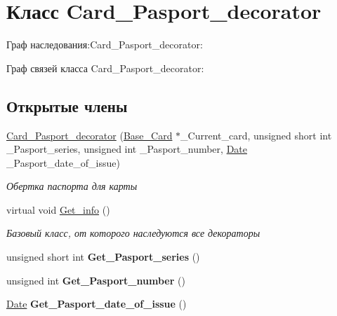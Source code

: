 \hypertarget{classCard__Pasport__decorator}{}\section{Класс Card\+\_\+\+Pasport\+\_\+decorator}
\label{classCard__Pasport__decorator}


Граф наследования\+:Card\+\_\+\+Pasport\+\_\+decorator\+:


Граф связей класса Card\+\_\+\+Pasport\+\_\+decorator\+:
\subsection*{Открытые члены}
\begin{DoxyCompactItemize}
\item 
\hyperlink{classCard__Pasport__decorator_a66287c3d536efc70968bb8cfbf84ebb1}{Card\+\_\+\+Pasport\+\_\+decorator} (\hyperlink{classBase__Card}{Base\+\_\+\+Card} $\ast$\+\_\+\+Current\+\_\+card, unsigned short int \+\_\+\+Pasport\+\_\+series, unsigned int \+\_\+\+Pasport\+\_\+number, \hyperlink{structDate}{Date} \+\_\+\+Pasport\+\_\+date\+\_\+of\+\_\+issue)
\begin{DoxyCompactList}\small\item\em Обертка паспорта для карты \end{DoxyCompactList}\item 
virtual void \hyperlink{classCard__Pasport__decorator_a7f349ba8c2063397072f963a0ea56500}{Get\+\_\+info} ()
\begin{DoxyCompactList}\small\item\em Базовый класс, от которого наследуются все декораторы \end{DoxyCompactList}\item 
unsigned short int {\bfseries Get\+\_\+\+Pasport\+\_\+series} ()\hypertarget{classCard__Pasport__decorator_a41338bd46956732d6aff6adfff41c332}{}\label{classCard__Pasport__decorator_a41338bd46956732d6aff6adfff41c332}

\item 
unsigned int {\bfseries Get\+\_\+\+Pasport\+\_\+number} ()\hypertarget{classCard__Pasport__decorator_a59cd750f3d8ff99819e4c6a5964a39d2}{}\label{classCard__Pasport__decorator_a59cd750f3d8ff99819e4c6a5964a39d2}

\item 
\hyperlink{structDate}{Date} {\bfseries Get\+\_\+\+Pasport\+\_\+date\+\_\+of\+\_\+issue} ()\hypertarget{classCard__Pasport__decorator_ab3074901efb6827e56a528edae665040}{}\label{classCard__Pasport__decorator_ab3074901efb6827e56a528edae665040}

\end{DoxyCompactItemize}


